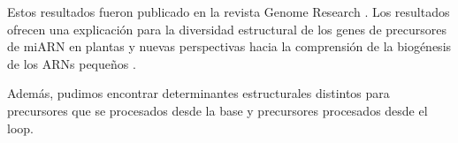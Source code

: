 Estos resultados fueron publicado en la revista Genome Research \citep{Bologna2013}.
Los resultados ofrecen una explicación para la diversidad estructural de los genes de precursores de miARN en plantas y nuevas perspectivas hacia la comprensión de la biogénesis de los ARNs pequeños \citep{Bologna2013}.

Además, pudimos encontrar determinantes estructurales distintos para precursores que se procesados desde la base y precursores procesados desde el loop.

